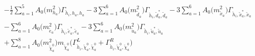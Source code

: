 \begin{align}
 &-\frac{1}{2} \sum_{a=1}^{5}{A_0\Big(m^2_{h_{{a}}}\Big)} {\Gamma_{\check{h}_{{i}},h_{{a}},h_{{a}}}}  -3 \sum_{a=1}^{6}{A_0\Big(m^2_{\tilde{d}_{{a}}}\Big)} {\Gamma_{\check{h}_{{i}},\tilde{d}^*_{{a}},\tilde{d}_{{a}}}}  -3 \sum_{a=1}^{6}{A_0\Big(m^2_{\tilde{x}_{{a}}}\Big)} {\Gamma_{\check{h}_{{i}},\tilde{x}^*_{{a}},\tilde{x}_{{a}}}}  \nonumber \\ 
 &- \sum_{a=1}^{6}{A_0\Big(m^2_{\tilde{e}_{{a}}}\Big)} {\Gamma_{\check{h}_{{i}},\tilde{e}^*_{{a}},\tilde{e}_{{a}}}}  -3 \sum_{a=1}^{6}{A_0\Big(m^2_{\tilde{u}_{{a}}}\Big)} {\Gamma_{\check{h}_{{i}},\tilde{u}^*_{{a}},\tilde{u}_{{a}}}}  \nonumber \\ 
 &+\sum_{a=1}^{8}{A_0\Big(m^2_{\tilde{\chi}^0_{{a}}}\Big)} m_{\tilde{\chi}^0_{{a}}} \Big({\Gamma^L_{\check{h}_{{i}},\tilde{\chi}^0_{{a}},\tilde{\chi}^0_{{a}}}} + {\Gamma^R_{\check{h}_{{i}},\tilde{\chi}^0_{{a}},\tilde{\chi}^0_{{a}}}}\Big) 
\end{align} 
